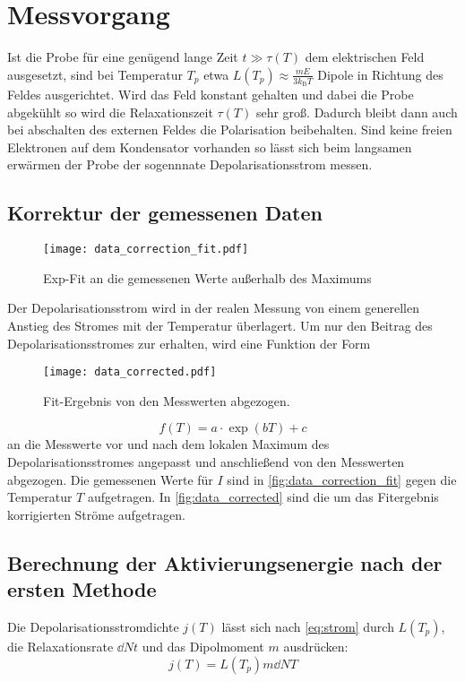 \section{Messvorgang}
\label{sec:messvorgang}

Ist die Probe für eine genügend lange Zeit $t \gg τ(T)$ dem elektrischen Feld ausgesetzt,
sind bei Temperatur $T_p$ etwa $L(T_p) \approx \frac{m E}{3 k_\text{B} T}$ Dipole in Richtung des Feldes ausgerichtet.
Wird das Feld konstant gehalten und dabei die Probe abgekühlt so wird die Relaxationszeit $τ(T)$ sehr groß.
Dadurch bleibt dann auch bei abschalten des externen Feldes die Polarisation beibehalten.
Sind keine freien Elektronen auf dem Kondensator vorhanden so lässt sich beim langsamen erwärmen der Probe der sogennnate Depolarisationsstrom messen.

\subsection{Korrektur der gemessenen Daten}
\begin{figure}
  \centering
  \texttt{[image: data\_correction\_fit.pdf]}
  \caption{Exp-Fit an die gemessenen Werte außerhalb des Maximums}
  \label{fig:data_correction_fit}
\end{figure}

Der Depolarisationsstrom wird in der realen Messung von einem generellen
Anstieg des Stromes mit der Temperatur überlagert.
Um nur den Beitrag des Depolarisationsstromes zur erhalten,
wird eine Funktion der Form

\begin{figure}
  \centering
  \texttt{[image: data\_corrected.pdf]}
  \caption{Fit-Ergebnis von den Messwerten abgezogen.}
  \label{fig:data_corrected}
\end{figure}
\begin{equation}
    f(T) = a \cdot \exp(b  T) + c
\end{equation}
an die Messwerte vor und nach dem lokalen Maximum des Depolarisationsstromes angepasst und anschließend von den
Messwerten abgezogen.
Die gemessenen Werte für $I$ sind in \autoref{fig:data_correction_fit}
gegen die Temperatur $T$ aufgetragen.
In \autoref{fig:data_corrected} sind die um das Fitergebnis korrigierten Ströme aufgetragen.

\subsection{Berechnung der Aktivierungsenergie nach der ersten Methode}
Die Depolarisationsstromdichte $j(T)$ lässt sich nach \eqref{eq:strom} durch $L(T_p)$, die Relaxationsrate
$\dd{N}{t}$ und das Dipolmoment $m$ ausdrücken:
\begin{equation}
  \label{eq:strom}
  j(T) = L(T_p) m \dd{N}{T}
\end{equation}

